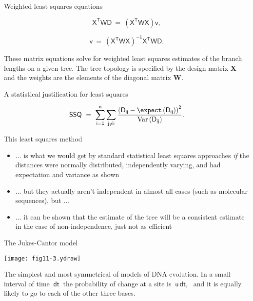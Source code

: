 \documentclass[bluish,slideColor,colorBG,pdf]{prosper}
\def\Var{{\rm Var}}        %
\begin{document}
\begin{slide}[Replace]{Weighted least squares equations}

{\large
\[
\mathsf{X^T W D\ =\ \left(X^T W X\right) v,}
\]

\[
\mathsf{v\ =\ \left(X^T W X\right)^{-1} X^T W D.}
\]
}
\bigskip

These matrix equations solve for weighted least squares estimates of the branch
lengths on a given tree.  The tree topology is specified by the design matrix
$\mathsf{\bm{X}}$ and the weights are the elements of the diagonal matrix $\mathsf{\bm
W}$.

\end{slide}

\begin{slide}[Replace]{A statistical justification for least squares}

\[
\mathsf{SSQ\  =\   \sum_{i=1}^n \sum_{j \neq i} \frac{\left(D_{ij} - \expect\left(D_{ij}\right)\right)^2} {\Var\left(D_{ij}\right)}.}
\]
\bigskip

This least squares method
\begin{itemize}
\item ... is what we would get by standard statistical least squares approaches
{\it if} the distances were normally distributed, independently varying, and
had expectation and variance as shown
\item ... but they actually aren't independent in almost all cases (such
as molecular sequences), but ...
\item ... it can be shown that the estimate of the tree will be a consistent
estimate in the case of non-independence, just not as efficient
\end{itemize}

\end{slide}


\begin{slide}[Replace]{The Jukes-Cantor model}

\centerline{\texttt{[image: fig11-3.ydraw]}}
\bigskip

The simplest and most symmetrical of models of DNA evolution.  In a small
interval of time $\ \mathsf{dt}\ $ the probability of change at a site is
$\ \mathsf{u\,dt}$, \ and it is equally likely to go to each of the other three
bases.

\end{slide}
\end{document}
